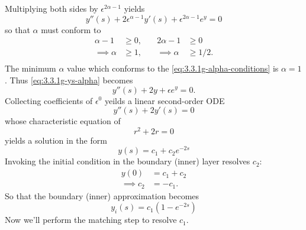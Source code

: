 \begin{description}
{\begin{equation*}
      \end{equation*}
      Multiplying both sides by $\epsilon^{2\alpha-1}$ yields
      \begin{equation}
        \label{eq:3.3.1g-ys-alpha}
        y''(s) + 2\epsilon^{\alpha-1}y'(s) + \epsilon^{2\alpha-1}e^y=0
      \end{equation}
      so that $\alpha$ must conform to
      \begin{equation}
        \label{eq:3.3.1g-alpha-conditions}
        \begin{aligned}
          \alpha-1&\ge0, &\quad 2\alpha-1&\ge0 \\
          \implies \alpha&\ge1, &\quad \implies \alpha&\ge1/2. \\
        \end{aligned}
      \end{equation}
      The minimum $\alpha$ value which conforms to the
      \cref{eq:3.3.1g-alpha-conditions} is $\alpha=1$. Thus \cref{eq:3.3.1g-ys-alpha}
      becomes
      \begin{equation*}
        \label{eq:3.3.1g-ys}
        y''(s) + 2y + \epsilon e^y=0.
      \end{equation*}
      Collecting coefficients of $\epsilon^0$ yeilds a linear second-order ODE\@
      \begin{equation*}
        y''(s) + 2y'(s) = 0
      \end{equation*}
      whose characteristic equation of
      \begin{equation*}
        r^2+2r=0
      \end{equation*}
      yields a solution in the form
      \begin{equation*}
        y(s) = c_1 + c_2e^{-2s}
      \end{equation*}
      Invoking the initial condition in the boundary (inner) layer resolves $c_2$:
      \begin{equation*}
        \begin{aligned}
          y(0) &= c_1+c_2 \\
          \implies c_2 &= -c_1.
        \end{aligned}
      \end{equation*}
      So that the boundary (inner) approximation becomes
      \begin{equation*}
        \boxed{y_i(s) = c_1(1-e^{-2s})}
      \end{equation*}
      Now we'll perform the matching step to resolve $c_1$.
      \begin{equation*}

\end{equation*}}
\end{description}

